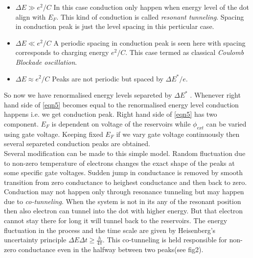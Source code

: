 \documentclass[a4paper]{report}
\begin{document}
      \begin{itemize}
        \item \textbf{$\Delta E \gg e^2/C$}  	In this case conduction only happen when energy level of the dot align with  $E_{F}$. This kind of conduction is called \emph{ resonant tunneling}. Spacing in conduction peak is just the level spacing in this perticular case.
        \item \textbf{$\Delta E \ll e^2/C$} A periodic spacing in conduction peak is seen here with spacing corresponds to charging energy $e^2/C$. This case termed as classical \emph{ Coulomb Blockade oscillation}.
        \item \textbf{$\Delta E \approx e^2/C$} Peaks are not periodic but spaced by $\Delta E^*/e$. 
      \end{itemize}
      So now we have renormalised energy levels separeted by $\Delta E^*$ . Whenever right hand side of \ref{eqn5} becomes equal to the renormalised energy level conduction happens i.e. we get conduction peak.
      Right hand side of \ref{eqn5} has two component. $E_{F}$ is dependent on voltage of the reservoirs while $\phi_{ext}$ can be varied using gate voltage.  
      Keeping fixed $E_{F}$ if we vary gate voltage continuously then several separeted conduction peaks are obtained.\\
      Several modification can be made to this simple model. Random fluctuation due to non-zero temperature of electrons changes the exact shape of the peaks at some specific gate voltages. Sudden jump in conductance is removed by smooth transition from zero conductance to heighest conductance and then back to zero. \\
      Conduction may not happen only through resonance tunneling but may happen due to \emph{co-tunneling}. When the system is not in its any of the resonant position then also electron can tunnel into the dot with higher energy. But that electron cannot stay there for long it will tunnel back to the reservoirs. The energy fluctuation in the process and the time scale are given by Heisenberg's uncertainty principle $\Delta E \Delta t \geq \frac{h}{4\pi}$. This co-tunneling is held responsible for non-zero conductance even in the halfway between two peaks(see fig2).
\end{document}
